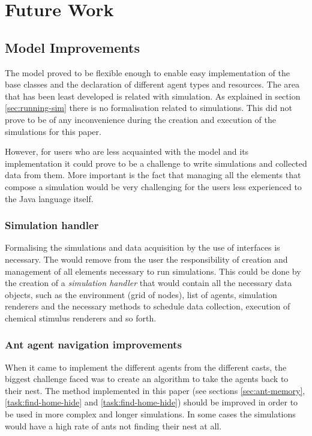 \chapter{Future Work}
\label{ch:future-work}

\section{Model Improvements}

The model proved to be flexible enough to enable easy implementation of the base classes and the declaration of different agent types and resources. The area that has been least developed is related with simulation. As explained in section \ref{sec:running-sim} there is no formalisation related to simulations. This did not prove to be of any inconvenience during the creation and execution of the simulations for this paper. 

However, for users who are less acquainted with the model and its implementation it could prove to be a challenge to write simulations and collected data from them. More important is the fact that managing all the elements that compose a simulation would be very challenging for the users less experienced to the Java language itself.

\subsection{Simulation handler}

Formalising the simulations and data acquisition by the use of interfaces is necessary. The would remove from the user the responsibility of creation and management of all elements necessary to run simulations. This could be done by the creation of a \emph{simulation handler} that would contain all the necessary data objects, such as the environment (grid of nodes), list of agents, simulation renderers and the necessary methods to schedule data collection, execution of chemical stimulus renderers and so forth.

\subsection{Ant agent navigation improvements}

When it came to implement the different agents from the different casts, the biggest challenge faced was to create an algorithm to take the agents back to their nest. The method implemented in this paper (see sections \ref{sec:ant-memory}, \ref{task:find-home-hide} and \ref{task:find-home-hide}) should be improved in order to be used in more complex and longer simulations. In some cases the simulations would have a high rate of ants not finding their nest at all.

